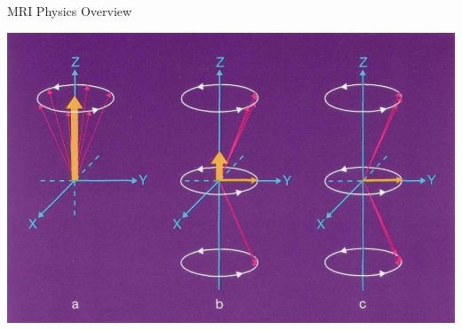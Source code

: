 \documentclass[aspectratio=169,xcolor=dvipsnames]{beamer}
\begin{document}

\begin{frame}{MRI Physics Overview}
\begin{center}
\includegraphics[width=.75\textwidth]{imgs/rfpulse2}

\end{center}
\end{frame}

\end{document}
